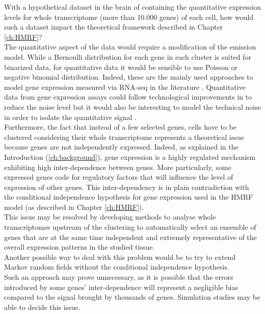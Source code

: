   With a hypothetical dataset in the brain of \platy{} containing the quantitative expression levels for whole transcriptome (more than 10.000 genes) of each cell, how would such a dataset impact the theoretical framework described in Chapter \ref{ch:HMRF}?\\
  
  The quantitative aspect of the data would require a modification of the emission model. While a Bernoulli distribution for each gene in each cluster is suited for binarized data, for quantitative data it would be sensible to use Poisson or negative binomial distribution. Indeed, these are the mainly used approaches to model gene expression measured via RNA-seq in the literature \citep{marioni08,anders10}.  Quantitative data from gene expression assays could follow technological improvements in to reduce the noise level but it would also be interesting to model the technical noise in order to isolate the quantitative signal \citep{brennecke13}.\\
  
  Furthermore, the fact that instead of a few selected genes, cells have to be clustered considering their whole transcriptome represents a theoretical issue because genes are not independently expressed. Indeed, as explained in the Introduction (\ref{ch:background}), gene expression is a highly regulated mechanism exhibiting high inter-dependence between genes. More particularly, some expressed genes code for regulatory factors that will influence the level of expression of other genes. This inter-dependency is in plain contradiction with the conditional independence hypothesis for gene expression used in the HMRF model (as described in Chapter \ref{ch:HMRF}).\\
  
  This issue may be resolved by developing methods to analyse whole transcriptomes upstream of the clustering to automatically select an ensemble of genes that are at the same time independent and extremely representative of the overall expression patterns in the studied tissue.\\
  
  Another possible way to deal with this problem would be to try to extend Markov random fields without the conditional independence hypothesis.\\
  
   Such an approach may prove unnecessary, as it is possible that the errors introduced by some genes' inter-dependence will represent a negligible bias compared to the signal brought by thousands of genes. Simulation studies may be able to decide this issue. 





	



